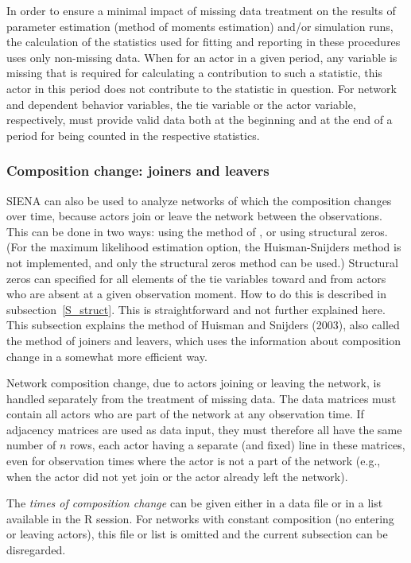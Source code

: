 \documentclass[a4paper,fleqn,11pt]{article}
\newcommand{\+}{\, + \,}
\newcommand{\R}{{\sf R }}
\newcommand{\SI}{{\sf SIENA }}
\begin{document}
In order to ensure a minimal impact of missing data treatment on
the results of parameter estimation (method of moments estimation)
and/or simulation runs, the calculation of the statistics
used for fitting and reporting in these procedures uses only
non-missing data.
When for an actor in a given period, any variable is missing that is
required for calculating a contribution to such a statistic, this
actor in this period does not contribute to the statistic in
question. For network and dependent behavior variables, the tie variable
or the actor variable, respectively,
must provide valid data both at the beginning and at the end of a
period for being counted in the respective statistics.

\subsubsection{Composition change: joiners and leavers}
\label{S_comp}

\SI can also be used to analyze networks of which the composition
changes over time, because actors join or leave the network
between the observations.
This can be done in two ways: using the method of \citet{HuismanSnijders03},
or using structural zeros.
(For the maximum likelihood estimation option, the Huisman-Snijders method
is not implemented, and only the structural zeros method can be used.)
Structural zeros can specified for all elements of the tie variables
toward and from actors who are absent at a given observation moment.
How to do this is described in subsection~\ref{S_struct}.
This is straightforward and not further explained here.
This subsection explains the method of Huisman and Snijders
(2003), also called the method of joiners and leavers,
which uses the information about composition change
in a somewhat more efficient way.

Network composition change, due to actors joining or leaving the
network, is handled separately from the treatment of missing data.
The data matrices must contain all actors who are part of the
network at any observation time.
If adjacency matrices are used as data input, they must therefore
all have the same number of $n$ rows, each actor
having a separate (and fixed) line in these matrices, even for
observation times where the actor is not a part of the network
(e.g., when the actor did not yet join or the actor already left
the network).

The \emph{times of composition change} can be given
either in a data file or in a list available in the \R session.
For networks with constant composition
(no entering or leaving actors), this file or list is
omitted and the current subsection can be disregarded.
\end{document}
